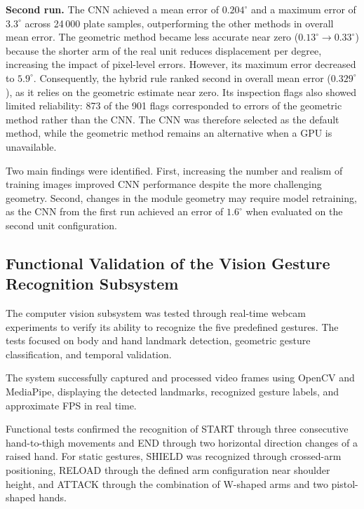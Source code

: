 \documentclass[lettersize,journal]{IEEEtran}
\begin{document}
	\textbf{Second run.} The CNN achieved a mean error of $0.204^\circ$ and a maximum error of $3.3^\circ$ across 24\,000 plate samples, outperforming the other methods in overall mean error. The geometric method became less accurate near zero ($0.13^\circ \rightarrow 0.33^\circ$) because the shorter arm of the real unit reduces displacement per degree, increasing the impact of pixel-level errors. However, its maximum error decreased to $5.9^\circ$. Consequently, the hybrid rule ranked second in overall mean error ($0.329^\circ$), as it relies on the geometric estimate near zero. Its inspection flags also showed limited reliability: 873 of the 901 flags corresponded to errors of the geometric method rather than the CNN. The CNN was therefore selected as the default method, while the geometric method remains an alternative when a GPU is unavailable.

	Two main findings were identified. First, increasing the number and realism of training images improved CNN performance despite the more challenging geometry. Second, changes in the module geometry may require model retraining, as the CNN from the first run achieved an error of $1.6^\circ$ when evaluated on the second unit configuration.

	\subsection{Functional Validation of the Vision Gesture Recognition Subsystem}
	
	The computer vision subsystem was tested through real-time webcam experiments to verify its ability to recognize the five predefined gestures. The tests focused on body and hand landmark detection, geometric gesture classification, and temporal validation.
	
	The system successfully captured and processed video frames using OpenCV and MediaPipe, displaying the detected landmarks, recognized gesture labels, and approximate FPS in real time.
	
	Functional tests confirmed the recognition of START through three consecutive hand-to-thigh movements and END through two horizontal direction changes of a raised hand. For static gestures, SHIELD was recognized through crossed-arm positioning, RELOAD through the defined arm configuration near shoulder height, and ATTACK through the combination of W-shaped arms and two pistol-shaped hands.
	
\end{document}
